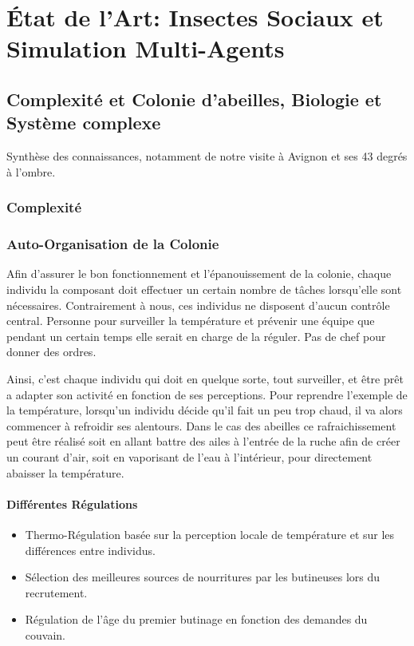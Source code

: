 \chapter{État de l'Art: Insectes Sociaux et Simulation Multi-Agents}
	\section{Complexité et Colonie d'abeilles, Biologie et Système complexe}
	\label{sectionBio}
			Synthèse des connaissances, notamment de notre visite à Avignon et ses 43 degrés à l'ombre.\\
		\subsection{Complexité}
		\subsection{Auto-Organisation de la Colonie}
			Afin d'assurer le bon fonctionnement et l'épanouissement de la colonie, chaque individu la composant doit effectuer un certain nombre de tâches lorsqu'elle sont nécessaires. Contrairement à nous, ces individus ne disposent d'aucun contrôle central. Personne pour surveiller la température et prévenir une équipe que pendant un certain temps elle serait en charge de la réguler. Pas de chef pour donner des ordres.
			
			Ainsi, c'est chaque individu qui doit en quelque sorte, tout surveiller, et être prêt a adapter son activité en fonction de ses perceptions. Pour reprendre l'exemple de la température, lorsqu'un individu décide qu'il fait un peu trop chaud, il va alors commencer à refroidir ses alentours. Dans le cas des abeilles ce rafraichissement peut être réalisé soit en allant battre des ailes à l'entrée de la ruche afin de créer un courant d'air, soit en vaporisant de l'eau à l'intérieur, pour directement abaisser la température. 		
			
			
			\subsubsection{Différentes Régulations}
			\begin{itemize}
				\item Thermo-Régulation basée sur la perception locale de température et sur les différences entre individus.
				\item Sélection des meilleures sources de nourritures par les butineuses lors du recrutement.
				\item Régulation de l'âge du premier butinage en fonction des demandes du couvain.
			\end{itemize}

